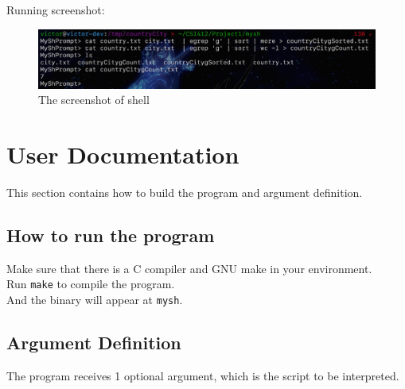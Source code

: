 \documentclass{article}
\begin{document}
Running screenshot:

\begin{figure}[H]
    \centering
    \includegraphics[width=15cm, screenshot]{img/project1_run_result.png}
    \caption{The screenshot of shell}
\end{figure}

\section{User Documentation}
This section contains how to build the program and argument definition.

\subsection{How to run the program}
Make sure that there is a C compiler and GNU make in your environment. \\
Run \texttt{make} to compile the program. \\
And the binary will appear at \texttt{mysh}.

\subsection{Argument Definition}
The program receives 1 optional argument, which is the script to be interpreted.
\end{document}
